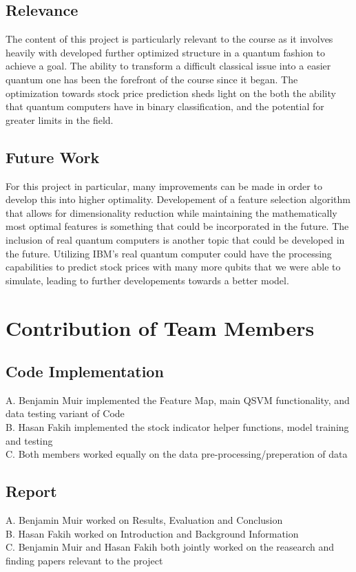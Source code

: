 \documentclass{article}
\begin{document}
\subsection*{Relevance}
The content of this project is particularly relevant to the course as it involves heavily with developed further optimized structure in a quantum fashion 
to achieve a goal. The ability to transform a difficult classical issue into a easier quantum one has been the forefront of the course since it began. 
The optimization towards stock price prediction sheds light on the both the ability that quantum computers have in binary classification, and the potential 
for greater limits in the field. 
\subsection*{Future Work}
For this project in particular, many improvements can be made in order to develop this into higher optimality. Developement of a 
feature selection algorithm that allows for dimensionality reduction while maintaining the mathematically most optimal features is something 
that could be incorporated in the future. The inclusion of real quantum computers is another topic that could be developed in the future. Utilizing IBM's real quantum computer
could have the processing capabilities to predict stock prices with many more qubits that we were able to simulate, leading to further developements towards a better model. 
\section*{Contribution of Team Members}
\subsection*{Code Implementation}
A. Benjamin Muir implemented the Feature Map, main QSVM functionality, and data testing variant of Code
\\
\noindent
B. Hasan Fakih implemented the stock indicator helper functions, model training and testing
\\
\noindent
C. Both members worked equally on the data pre-processing/preperation of data  
\subsection*{Report}
A. Benjamin Muir worked on Results, Evaluation and Conclusion 
\\
\noindent
B. Hasan Fakih worked on Introduction and Background Information
\\
C. Benjamin Muir and Hasan Fakih both jointly worked on the reasearch and finding papers relevant to the project
\end{document}
